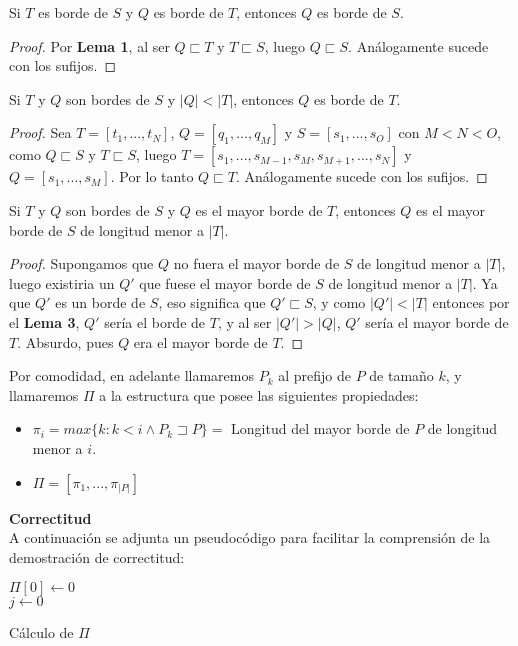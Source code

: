 \begin{lem}
Si $T$ es borde de $S$ y $Q$ es borde de $T$, entonces $Q$ es borde de $S$.
\end{lem}
\begin{proof}
Por \textbf{Lema 1}, al ser $Q \sqsubset T$ y $T \sqsubset S$, luego $Q \sqsubset S$. Análogamente sucede con los sufijos.
\end{proof}

\begin{lem}
Si $T$ y $Q$ son bordes de $S$ y $|Q|<|T|$, entonces $Q$ es borde de $T$.
\end{lem}
\begin{proof}
Sea $T = [t_1,...,t_N]$, $Q = [q_1,...,q_M]$ y $S = [s_1,...,s_O]$ con $M < N < O$, como $Q \sqsubset S$ y $T \sqsubset S$, luego $T = [s_1,..., s_{M-1},s_M,s_{M+1},...,s_N]$ y $Q = [s_1,...,s_M]$. Por lo tanto $Q \sqsubset T$. Análogamente sucede con los sufijos.
\end{proof}

\begin{lem}
Si $T$ y $Q$ son bordes de $S$ y $Q$ es el mayor borde de $T$, entonces $Q$ es el mayor borde de $S$ de longitud menor a $|T|$.
\end{lem}
\begin{proof}
Supongamos que $Q$ no fuera el mayor borde de $S$ de longitud menor a $|T|$, luego existiria un $Q'$ que fuese el mayor borde de $S$ de longitud menor a $|T|$. Ya que $Q'$ es un borde de $S$, eso significa que $Q' \sqsubset S$, y como $|Q'| < |T|$ entonces por el \textbf{Lema 3}, $Q'$ sería el borde de $T$, y al ser $|Q'| > |Q|$, $Q'$ sería el mayor borde de $T$. Absurdo, pues $Q$ era el mayor borde de $T$.
\end{proof}

Por comodidad, en adelante llamaremos $P_k$ al prefijo de $P$ de tamaño $k$, y llamaremos $\Pi$ a la estructura que posee las siguientes propiedades:
\begin{itemize}
	\item $\pi_i = max \{k: k < i \wedge P_k \sqsupset P\} = $ Longitud del mayor borde de $P$ de longitud menor a $i$.
	\item $\Pi = [\pi_1,...,\pi_{|P|}]$
\end{itemize}

\textbf{Correctitud}\\
A continuación se adjunta un pseudocódigo para facilitar la comprensión de la demostración de correctitud:\\
\begin{algorithm}[H]
 \DontPrintSemicolon
 \KwResult{$\Pi$}
 $\Pi[0] \gets 0$\\
 $j \gets 0$\\
 \caption{Cálculo de $\Pi$}
\end{algorithm}

